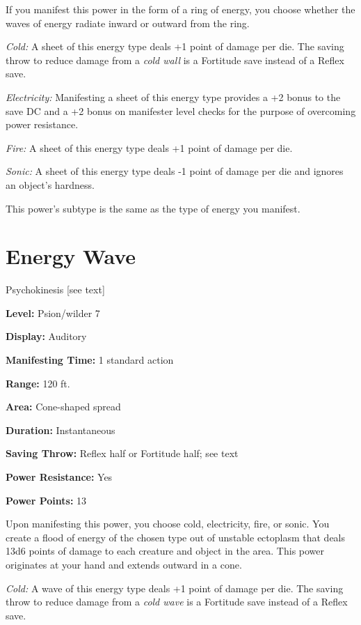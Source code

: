 \documentclass{article}
\begin{document}
If you manifest this power in the form of a ring of energy, you choose whether 
the waves of energy radiate inward or outward from the ring.

\textit{Cold: }A sheet of this energy type deals +1 point of damage per die. The 
saving throw to reduce damage from a \textit{cold wall }is a Fortitude save instead 
of a Reflex save.

\textit{Electricity: }Manifesting a sheet of this energy type provides a +2 bonus 
to the save DC and a +2 bonus on manifester level checks for the purpose of overcoming 
power resistance.

\textit{Fire: }A sheet of this energy type deals +1 point of damage per die.

\textit{Sonic: }A sheet of this energy type deals -1 point of damage per die and 
ignores an object's hardness.

This power's subtype is the same as the type of energy you manifest.

\vspace{12pt}
\section*{Energy Wave}

Psychokinesis [see text]

\textbf{Level:} Psion/wilder 7

\textbf{Display:} Auditory

\textbf{Manifesting Time:} 1 standard action

\textbf{Range:} 120 ft.

\textbf{Area:} Cone-shaped spread

\textbf{Duration:} Instantaneous

\textbf{Saving Throw:} Reflex half or Fortitude half; see text

\textbf{Power Resistance:} Yes

\textbf{Power Points:} 13

Upon manifesting this power, you choose cold, electricity, fire, or sonic. You 
create a flood of energy of the chosen type out of unstable ectoplasm that deals 
13d6 points of damage to each creature and object in the area. This power originates 
at your hand and extends outward in a cone.

\textit{Cold: }A wave of this energy type deals +1 point of damage per die. The 
saving throw to reduce damage from a \textit{cold wave }is a Fortitude save instead 
of a Reflex save.
\end{document}

